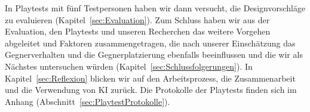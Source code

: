 \documentclass[../Main.tex]{subfiles}
\begin{document}
In Playtests mit fünf Testpersonen haben wir dann versucht, die Designvorschläge zu evaluieren (Kapitel~\ref{sec:Evaluation}). Zum Schluss haben wir aus der Evaluation, den Playtests und unseren Recherchen das weitere Vorgehen abgeleitet und Faktoren zusammengetragen, die nach unserer Einschätzung das Gegnerverhalten und die Gegnerplatzierung ebenfalls beeinflussen und die wir als Nächstes untersuchen würden (Kapitel~\ref{sec:Schlussfolgerungen}). In Kapitel~\ref{sec:Reflexion} blicken wir auf den Arbeitsprozess, die Zusammenarbeit und die Verwendung von KI zurück. Die Protokolle der Playtests finden sich im Anhang (Abschnitt~\ref{sec:PlaytestProtokolle}).

\newpage
\end{document}

